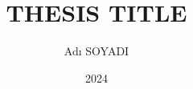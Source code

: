 \documentclass[oneandhalf,chaparabic]{harran}%
\author{Adı SOYADI}
\title{THESIS TITLE}
\date{2024}
\begin{document}

\begin{preliminaries}
  \maketitle
  \makeapproval

  \tableofcontents
  \singlespacing
  
  
  \setlength\parindent{1cm}
  
  
\setlength{\parskip}{3pt}
  \listoffigures
  \listoftables
% 

  \end{preliminaries}


\setlength{\parskip}{10pt}

\makeatletter 
\pagestyle{fancy}
\lhead[\fancyplain{}{\small\bfseries\leftmark}]
{\fancyplain{}{\small\bfseries\leftmark}}    
\renewcommand{\chaptermark}[1]{\markboth{\thechapter.\space#1}{}} 
\rhead{ \small\bfseries\@author }
\fancyfoot[C]{\rm\fontsize{10pt}{10pt}\selectfont\thepage} %
\renewcommand{\footrulewidth}{0pt}
\makeatother






\newpage
\pagestyle{plain}


\renewcommand\bibname{\vskip-3mm \protect\numberline{KAYNAKLAR}}
\def\bibpreamble{\protect\addcontentsline{toc}{leads}{KAYNAKLAR}}
\setlength{\bibhang}{1.5cm}
\setlength{\bibsep}{0.0pt}


\newpage




%
\end{document}
